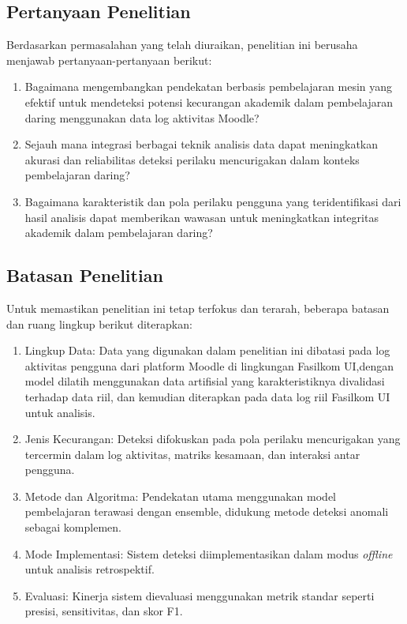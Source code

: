 \subsection{Pertanyaan Penelitian}
\label{sec:definisiMasalah}
Berdasarkan permasalahan yang telah diuraikan, penelitian ini berusaha menjawab pertanyaan-pertanyaan berikut:
\begin{enumerate}
    \item Bagaimana mengembangkan pendekatan berbasis pembelajaran mesin yang efektif untuk mendeteksi potensi kecurangan akademik dalam pembelajaran daring menggunakan data log aktivitas Moodle?
    \item Sejauh mana integrasi berbagai teknik analisis data dapat meningkatkan akurasi dan reliabilitas deteksi perilaku mencurigakan dalam konteks pembelajaran daring?
    \item Bagaimana karakteristik dan pola perilaku pengguna yang teridentifikasi dari hasil analisis dapat memberikan wawasan untuk meningkatkan integritas akademik dalam pembelajaran daring?
\end{enumerate}

\subsection{Batasan Penelitian}
\label{sec:batasanMasalah}
Untuk memastikan penelitian ini tetap terfokus dan terarah, beberapa batasan dan ruang lingkup berikut diterapkan:
\begin{enumerate}
    \item Lingkup Data: Data yang digunakan dalam penelitian ini dibatasi pada log aktivitas pengguna dari platform Moodle di lingkungan Fasilkom UI,dengan model dilatih menggunakan data artifisial yang karakteristiknya divalidasi terhadap data riil, dan kemudian diterapkan pada data log riil Fasilkom UI untuk analisis.
    \item Jenis Kecurangan: Deteksi difokuskan pada pola perilaku mencurigakan yang tercermin dalam log aktivitas, matriks kesamaan, dan interaksi antar pengguna.
    \item Metode dan Algoritma: Pendekatan utama menggunakan model pembelajaran terawasi dengan ensemble, didukung metode deteksi anomali sebagai komplemen.
    \item Mode Implementasi: Sistem deteksi diimplementasikan dalam modus \textit{offline} untuk analisis retrospektif.
    \item Evaluasi: Kinerja sistem dievaluasi menggunakan metrik standar seperti presisi, sensitivitas, dan skor F1.
\end{enumerate}

